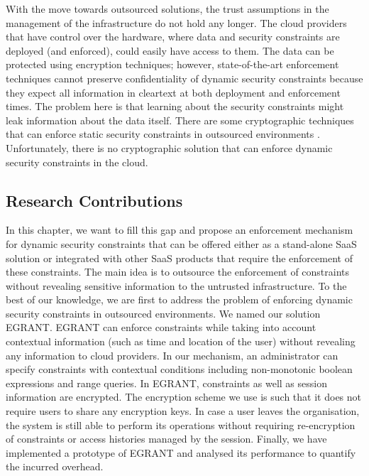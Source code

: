 \documentclass[epsfig,a4paper,11pt,titlepage]{book}
\numberwithin{algorithm}{chapter}
\begin{document}
With the move towards outsourced solutions, the trust assumptions in the management of the infrastructure do not hold any longer. The cloud providers that have control over the hardware, where data and security constraints are deployed (and enforced), could easily have access to them. The data can be protected using encryption techniques; however, state-of-the-art enforcement techniques \cite{Crampton:2009, Joshi:2005, Ahn:2000, Gligor:1998} cannot preserve confidentiality of dynamic security constraints because they expect all information in cleartext at both deployment and enforcement times. The problem here is that learning about the security constraints might leak information about the data itself. There are some cryptographic techniques that can enforce static security constraints in outsourced environments \cite{Asghar2013-COSE, Asghar2011-CCS, Asghar2011-ARES, Vimercati:2010, Vimercati:2007:VLDB}. Unfortunately, there is no cryptographic solution that can enforce dynamic security constraints in the cloud.

\subsection{Research Contributions}
In this chapter, we want to fill this gap and propose an enforcement mechanism for dynamic security constraints that can be offered either as a stand-alone \gls{SaaS} solution or integrated with other \gls{SaaS} products that require the enforcement of these constraints. The main idea is to outsource the enforcement of constraints without revealing sensitive information to the untrusted infrastructure. To the best of our knowledge, we are first to address the problem of enforcing dynamic security constraints in outsourced environments. We named our solution \gls{EGRANT}. \gls{EGRANT} can enforce constraints while taking into account contextual information (such as time and location of the user) without revealing any information to cloud providers. In our mechanism, an administrator can specify constraints with contextual conditions including non-monotonic boolean expressions and range queries. In \gls{EGRANT}, constraints as well as session information are encrypted. The encryption scheme we use is such that it does not require users to share any encryption keys. In case a user leaves the organisation, the system is still able to perform its operations without requiring re-encryption of constraints or access histories managed by the session. Finally, we have implemented a prototype of \gls{EGRANT} and analysed its performance to quantify the incurred overhead.
\end{document}
